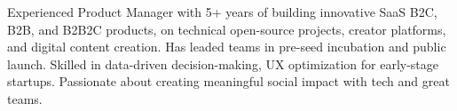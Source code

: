 



Experienced Product Manager with 5+ years of building innovative SaaS B2C, B2B, and B2B2C products,
on technical open-source projects,
creator platforms, and digital content creation.
%
Has leaded teams in pre-seed incubation and public launch.
Skilled in data-driven decision-making,
UX optimization
for early-stage startups.
Passionate about creating meaningful social impact with tech and great teams. %


%

